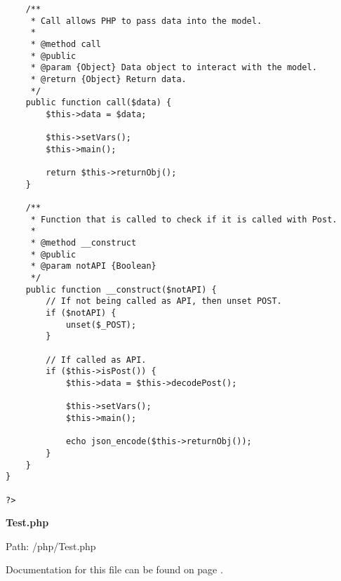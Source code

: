 {\begin{lstlisting}
	/**
	 * Call allows PHP to pass data into the model.
	 *
	 * @method call
	 * @public
	 * @param {Object} Data object to interact with the model.
	 * @return {Object} Return data.
	 */
	public function call($data) {
		$this->data = $data;

		$this->setVars();
		$this->main();

		return $this->returnObj();
	}

	/**
	 * Function that is called to check if it is called with Post.
	 *
	 * @method __construct
	 * @public
	 * @param notAPI {Boolean}
	 */
	public function __construct($notAPI) {
		// If not being called as API, then unset POST.
		if ($notAPI) {
			unset($_POST);
		}

		// If called as API.
		if ($this->isPost()) {
			$this->data = $this->decodePost();

			$this->setVars();
			$this->main();

			echo json_encode($this->returnObj());
		}
	}
}

?>
\end{lstlisting}
}
\textbf{Test.php}\label{Test.php}

Path: /php/Test.php

Documentation for this file can be found on page \pageref{Test.php.doc}.

